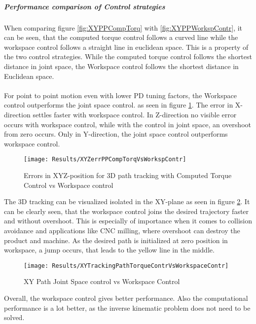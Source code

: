 \subparagraph{Performance comparison of Control strategies}
When comparing figure \ref{fig:XYPPCompTorq} with \ref{fig:XYPPWorkspContr}, it can be seen, that the computed torque control follows a curved line while the workspace control follows a straight line in euclidean space. This is a property of the two control strategies. While the computed torque control follows the shortest distance in joint space, the Workspace control follows the shortest distance in Euclidean space.\\
\\
For point to point motion even with lower PD tuning factors, the Workspace control outperforms the joint space control. as seen in figure \ref{fig:XYZerrPPCompTorqVsWorkspContr}. The error in X-direction settles faster with workspace control. In Z-direction no visible error occurs with workspace control, while with the control in joint space, an overshoot from zero occurs. Only in Y-direction, the joint space control outperforms workspace control.
\begin{figure}[H]
	\texttt{[image: Results/XYZerrPPCompTorqVsWorkspContr]}
	\caption{Errors in XYZ-position for 3D path tracking with Computed Torque Control vs Workspace control}
	\label{fig:XYZerrPPCompTorqVsWorkspContr}
\end{figure}

The 3D tracking can be visualized isolated in the XY-plane as seen in figure \ref{fig:XYTrackingPathTorqueContrVsWorkspaceContr}. It can be clearly seen, that the workspace control joins the desired trajectory faster and without overshoot. This is especially of importance when it comes to collision avoidance and applications like \ac{CNC} milling, where overshoot can destroy the product and machine. As the desired path is initialized at zero position in workspace, a jump occurs, that leads to the yellow line in the middle.

\begin{figure}[H]
	\texttt{[image: Results/XYTrackingPathTorqueContrVsWorkspaceContr]}
	\caption{XY Path Joint Space control vs Workspace Control}
	\label{fig:XYTrackingPathTorqueContrVsWorkspaceContr}
\end{figure}



Overall, the workspace control gives better performance. Also the computational performance is a lot better, as the inverse kinematic problem does not need to be solved.

